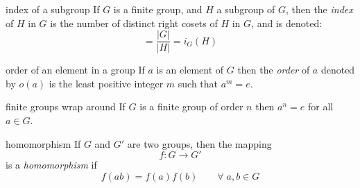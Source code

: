 \documentclass[avery5371,grid]{flashcards}
\begin{document}
\begin{flashcard}[Definition]{index of a subgroup}
If $G$ is a finite group, and $H$ a subgroup of $G$, then the
\textit{index} of $H$ in $G$ is the number of distinct right cosets
of $H$ in $G$, and is denoted:
\begin{equation*}
[G : H] = \dfrac{|G|}{|H|} = i_{G}(H)
\end{equation*}
\end{flashcard}

\begin{flashcard}[Definition]{order of an element in a group}
If $a$ is an element of $G$ then the \textit{order} of $a$ denoted by $o(a)$ is the least positive integer $m$ such that $a^m = e$.
\end{flashcard}

\begin{flashcard}[Theorem]{finite groups wrap around}
If $G$ is a finite group of order $n$ then $a^n = e$ for all $a \in G$.
\end{flashcard}




\begin{flashcard}[Definition]{homomorphism}
If $G$ and $G'$ are two groups, then the mapping
\begin{equation*}
f: G\rightarrow G'
\end{equation*}
is a \textit{homomorphism} if 
\begin{equation*}
f(ab) = f(a)f(b) \qquad \forall \; a,b \in G
\end{equation*}
\end{flashcard}
\end{document}
